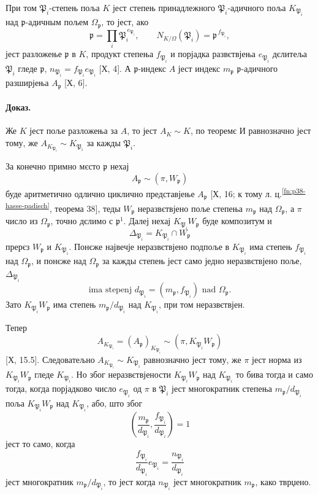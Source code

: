 \documentclass[11pt]{article}
\begin{document}
При том \( \mathfrak P_i\)-степењ поља \(K\) јест степењ принадлежного \( \mathfrak P_i\)-адичного поља \(K_{\mathfrak P_i}\) над \( \mathfrak p\)-адичным пољем \(\Omega_{\mathfrak p}\), то јест, ако
\[
\mathfrak p=\prod_i \mathfrak P_i^{\,e_{\mathfrak P_i}},
        \qquad N_{K/\Omega}(\mathfrak P_i)=\mathfrak p^{\,f_{\mathfrak P_i}},
\]
јест разложење \(\mathfrak p\) в \(K\), продукт степења \(f_{\mathfrak P_i}\) и порјадка развєтвјења \(e_{\mathfrak P_i}\) дєлитеља \(\mathfrak P_i\) гледе \(\mathfrak p\), \(n_{\mathfrak P_i}=f_{\mathfrak P_i}e_{\mathfrak P_i}\) [Х, 4]. А \( \mathfrak p\)-индекс \(A\) јест индекс \(m_{\mathfrak p}\) \( \mathfrak p\)-адичного разширјења \(A_{\mathfrak p}\) [Х, 6].

\paragraph{Доказ.}
Же \(K\) јест поље разложења за \(A\), то јест \(A_K\sim K\), по теоремє И равнозначно јест тому, же \(A_{K_{\mathfrak P_i}}\sim K_{\mathfrak P_i}\) за кажды \(\mathfrak P_i\).

За конечно примно мєсто \(\mathfrak p\) нехај
\[
        A_{\mathfrak p}\sim(\pi,W_{\mathfrak p})
\]
буде аритметично одлично циклично представјење \(A_{\mathfrak p}\) [Х, 16; к тому л. ц.\textsuperscript{\ref{fn:p38-hasse-padisch}}, теорема 38], теды \(W_{\mathfrak p}\) неразвєтвјено поље степења \(m_{\mathfrak p}\) над \(\Omega_{\mathfrak p}\), а \(\pi\) число из \(\Omega_{\mathfrak p}\), точно дєлимо с \(\mathfrak p^1\). Далеј нехај \(K_{\mathfrak P_i}W_{\mathfrak p}\) буде композитум и
\[
        \Delta_{\mathfrak P_i}=K_{\mathfrak P_i}\cap W_{\mathfrak p}
\]
прерєз \(W_{\mathfrak p}\) и \(K_{\mathfrak P_i}\). Понєже највечје неразвєтвјено подпоље в \(K_{\mathfrak P_i}\) има степењ \(f_{\mathfrak P_i}\) над \(\Omega_{\mathfrak p}\), и понєже над \(\Omega_{\mathfrak p}\) за кажды степењ јест само једно неразвєтвјено поље, \(\Delta_{\mathfrak P_i}\)
\[
        \text{ima stepenj }d_{\mathfrak P_i}=(m_{\mathfrak p},f_{\mathfrak P_i})\text{ nad }\Omega_{\mathfrak p}.
\]
Зато \(K_{\mathfrak P_i}W_{\mathfrak p}\) има степењ \(m_{\mathfrak p}/d_{\mathfrak P_i}\) над \(K_{\mathfrak P_i}\), при том неразвєтвјен.

Тепер
\[
        A_{K_{\mathfrak P_i}}=(A_{\mathfrak p})_{K_{\mathfrak P_i}}\sim(\pi,K_{\mathfrak P_i}W_{\mathfrak p})
\]
[Х, 15.5]. Следоватељно \(A_{K_{\mathfrak P_i}}\sim K_{\mathfrak P_i}\) равнозначно јест тому, же \(\pi\) јест норма из \(K_{\mathfrak P_i}W_{\mathfrak p}\) гледе \(K_{\mathfrak P_i}\). Но због неразвєтвјености \(K_{\mathfrak P_i}W_{\mathfrak p}\) над \(K_{\mathfrak P_i}\) то бива тогда и само тогда, когда порјадково число \(e_{\mathfrak P_i}\) од \(\pi\) в \(\mathfrak P_i\) јест многократник степења \(m_{\mathfrak p}/d_{\mathfrak P_i}\) поља \(K_{\mathfrak P_i}W_{\mathfrak p}\) над \(K_{\mathfrak P_i}\), або, што због
\[
\left(\frac{m_{\mathfrak p}}{d_{\mathfrak P_i}},\frac{f_{\mathfrak P_i}}{d_{\mathfrak P_i}}\right)=1
\]
јест то само, когда
\[
\frac{f_{\mathfrak P_i}}{d_{\mathfrak P_i}}e_{\mathfrak P_i}=\frac{n_{\mathfrak P_i}}{d_{\mathfrak P_i}}
\]
јест многократник \(m_{\mathfrak p}/d_{\mathfrak P_i}\), то јест когда \(n_{\mathfrak P_i}\) јест многократник \(m_{\mathfrak p}\), како тврџено.
\end{document}
